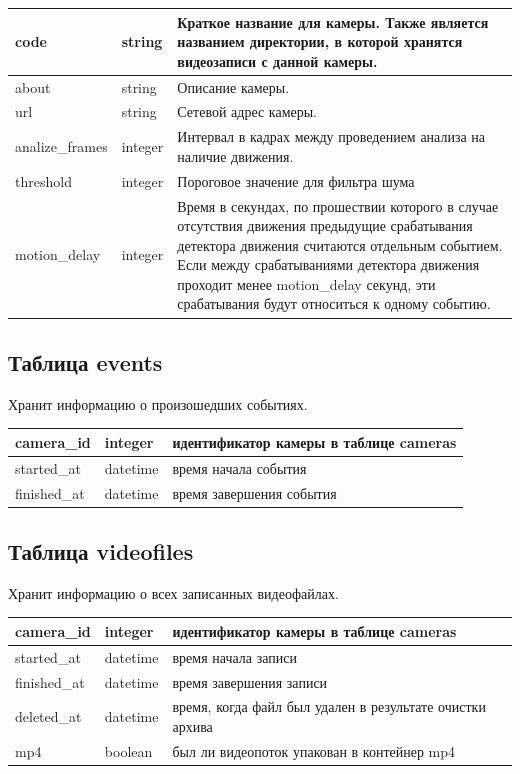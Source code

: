 \begin{center}
\begin{tabular}{ | l | l | p{11cm} |}
\hline
code & string & Краткое название для камеры. Также является названием директории, в которой хранятся видеозаписи с данной камеры. \\ \hline
about & string & Описание камеры. \\ \hline
url & string & Сетевой адрес камеры. \\ \hline
analize\_frames & integer & Интервал в кадрах между проведением анализа на наличие движения. \\ \hline
threshold & integer & Пороговое значение для фильтра шума \\ \hline
motion\_delay & integer & Время в секундах, по прошествии которого в случае отсутствия движения предыдущие срабатывания детектора движения считаются отдельным событием. Если между срабатываниями детектора движения проходит менее motion\_delay секунд, эти срабатывания будут относиться к одному событию. \\ \hline
\end{tabular}
\end{center}

\subsection{Таблица events}
Хранит информацию о произошедших событиях.

\begin{center}
\begin{tabular}{ | l | l | p{11cm} |}
\hline
camera\_id & integer & идентификатор камеры в таблице cameras \\ \hline
started\_at & datetime & время начала события \\ \hline
finished\_at & datetime & время завершения события \\ \hline
\end{tabular}
\end{center}

\subsection{Таблица videofiles}
Хранит информацию о всех записанных видеофайлах.

\begin{center}
\begin{tabular}{ | l | l | p{11cm} |}
\hline
camera\_id & integer & идентификатор камеры в таблице cameras \\ \hline
started\_at & datetime & время начала записи \\ \hline
finished\_at & datetime & время завершения записи \\ \hline
deleted\_at & datetime & время, когда файл был удален в результате очистки архива \\ \hline
mp4 & boolean & был ли видеопоток упакован в контейнер mp4 \\ \hline
\end{tabular}
\end{center}
